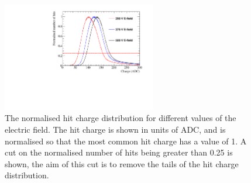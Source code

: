 \begin{figure}
  \centering
  \includegraphics[width=0.6\textwidth]{Canvas_ChargeCut_ElecField}
  \caption[The normalised hit charge distribution for different values of the electric field]
          {The normalised hit charge distribution for different values of the electric field. The hit charge is shown in units of ADC, and is normalised so that the most common hit charge has a value of 1. A cut on the normalised number of hits being greater than 0.25 is shown, the aim of this cut is to remove the tails of the hit charge distribution.}
  \label{fig:DiffElecStudy_ChargeCut}
\end{figure}


